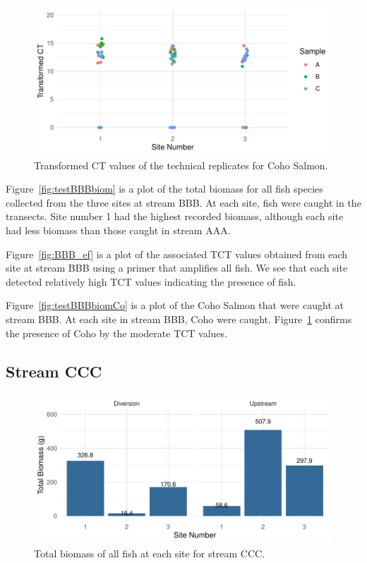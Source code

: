 \begin{figure}[H]
\centering
\includegraphics{Chapter5Images/BBB_co_tct.pdf}
\caption{ Transformed CT values of the technical replicates for Coho Salmon.}
\label{fig:BBB_co}
\end{figure}

Figure~\ref{fig:testBBBbiom} is a plot of the total biomass for all fish species collected from the three sites at stream BBB. At each site, fish were caught in the transects. Site number 1 had the highest recorded biomass, although each site had less biomass than those caught in stream AAA. 

\vspace{5mm}

Figure~\ref{fig:BBB_ef} is a plot of the associated TCT values obtained from each site at stream BBB using a primer that amplifies all fish. We see that each site detected relatively high TCT values indicating the presence of fish.

\vspace{5mm}

Figure~\ref{fig:testBBBbiomCo} is a plot of the Coho Salmon that were caught at stream BBB. At each site in stream BBB, Coho were caught. Figure~\ref{fig:BBB_co} confirms the presence of Coho by the moderate TCT values. 

\newpage

\subsection{Stream CCC}




\begin{figure}[H]
\centering
\includegraphics{Chapter5Images/CCC_Ef_new.pdf}
\caption{ Total biomass of all fish at each site for stream CCC.}
\label{fig:testCCCbiomEf}
\end{figure}



